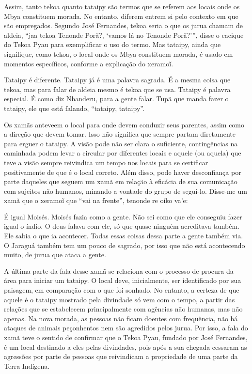 Assim, tanto tekoa quanto tataipy são termos que se referem aos locais
onde os Mbya constituem morada. No entanto, diferem entrem si pelo
contexto em que são empregados. Segundo José Fernandes, tekoa seria o
que os jurua chamam de aldeia, ``jaa tekoa Tenonde Porã?, ‘vamos lá no
Tenonde Porã?’'', disse o cacique do Tekoa Pyau para exemplificar o uso
do termo. Mas tataipy, ainda que signifique, como tekoa, o local onde
os Mbya constituem morada, é usado em momentos específicos, conforme a
explicação do xeramo\~{i}. 

Tataipy é diferente. Tataipy já é uma palavra sagrada. É a mesma coisa
que tekoa, mas para falar de aldeia mesmo é tekoa que se usa. Tataipy é
palavra especial. É como diz Nhanderu, para a gente falar. Tupã que
manda fazer o tataipy, ele que está falando, ``tataipy, tataipy''.

Os xamãs anteveem o local para onde devem conduzir seus parentes, assim
como a direção que devem tomar. Isso não significa que sempre partam
diretamente para erguer o tataipy. A visão pode não ser clara o
suficiente, contingências na caminhada podem levar a circular por
diferentes locais e aquele (ou aquela) que teve a visão sempre
reivindica um tempo nos locais para se certificar positivamente de que
é o local correto. Além disso, pode haver desconfiança por parte
daqueles que seguem um xamã em relação à eficácia de sua comunicação
com sujeitos não humanos, minando a vontade do grupo de segui-lo.
Disse-me um xamã que o xeramo\~{i} que ``vai na
frente'', tenonde re oiko va’e:

É igual Moisés. Moisés fazia como a gente. Não sei como que ele
conseguiu fazer igual o índio. O deus falava com ele, só que quase
ninguém acreditava também. Ele sabia o que ia acontecer. Todas essas
coisas dessa parte a gente também via. O Jaraguá também tem um pouco de
sagrado, por isso que não está acontecendo muito, de jurua que ataca a
gente.

A última parte da fala desse xamã se relaciona com o processo de procura
da área para iniciar um tataipy. O local deve, inicialmente, ser
identificado por sua paisagem, em comparação com o que foi sonhado. No
entanto, a certeza de que aquele é o tataipy mostrado pela divindade só
vem com o tempo, a partir das relações que se estabelecem
principalmente com agências não humanas, mas não apenas. Na nova
morada, as pessoas não ficam doentes com frequência, não há ataques de
animais peçonhentos nem são agredidos pelos jurua. Por isso, a fala do
xamã teve o sentido de confirmar que o Tekoa Pyau, fundado por José
Fernandes, é um local destinado a eles pelas divindades, pois após a
sua chegada cessaram as agressões por parte de pessoas que reivindicam
a propriedade de uma parte da Terra Indígena.

